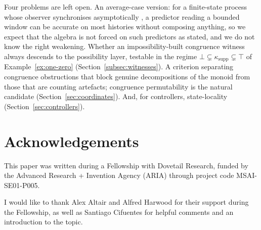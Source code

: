 \documentclass[10pt]{article}
\theoremstyle{definition}
\theoremstyle{remark}
\begin{document}
Four problems are left open.  An average-case version: for a
finite-state process whose observer synchronises asymptotically
\cite{TraversCrutchfield2011b}, a predictor reading a bounded window
can be accurate on most histories without composing anything, so we
expect that the algebra is not forced on such predictors as stated,
and we do not know the right weakening.  Whether an impossibility-built congruence
witness always descends to the possibility layer, testable in the
regime $\bot\subsetneq\kappa_{\mathrm{supp}}\subsetneq\top$ of
Example~\ref{ex:one-zero} (Section~\ref{subsec:witnesses}).  A
criterion separating congruence obstructions that block genuine
decompositions of the monoid from those that are counting artefacts;
congruence permutability is the natural candidate
(Section~\ref{sec:coordinates}).  And, for controllers,
state-locality (Section~\ref{sec:controllers}).

\section*{Acknowledgements}
This paper was written during a Fellowship with Dovetail Research,
funded by the Advanced Research + Invention Agency (ARIA) through
project code MSAI-SE01-P005.

I would like to thank Alex Altair and Alfred Harwood for their support
during the Fellowship, as well as Santiago Cifuentes for helpful
comments and an introduction to the topic.
\end{document}
